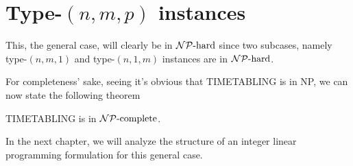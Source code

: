 \section{Type-$(n, m, p)$ instances}

This, the general case, will clearly be in $\mathcal{NP}{\text{-hard}}$ since two subcases, namely type-$(n, m, 1)$ and type-$(n, 1, m)$ instances are in $\mathcal{NP}{\text{-hard}}$.

For completeness' sake, seeing it's obvious that TIMETABLING is in NP, we can now state the following theorem

\begin{thm}
TIMETABLING is in $\mathcal{NP}{\text{-complete}}$.
\end{thm}

In the next chapter, we will analyze the structure of an integer linear programming formulation for this general case.
